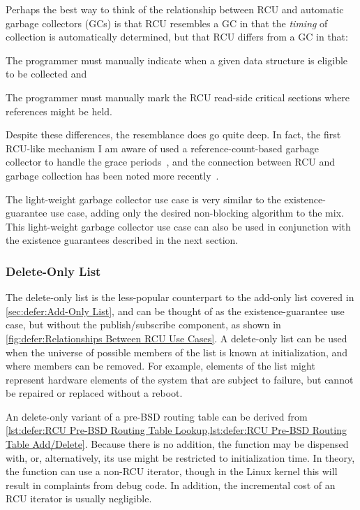 Perhaps the best way to think of the relationship between RCU
and automatic garbage collectors (GCs) is that RCU resembles
a GC in that the \emph{timing} of collection is automatically
determined, but that RCU differs from a GC in that:
\begin{enumerate*}[(1)]
\item The programmer must manually indicate when a given data
structure is eligible to be collected and
\item The programmer must manually mark the RCU read-side critical
sections where references might be held.
\end{enumerate*}

Despite these differences, the resemblance does go quite deep.
In fact, the first RCU-like mechanism I am aware of used a
reference-count-based garbage collector to handle the grace
periods~\cite{Kung80}, and the connection between RCU and
garbage collection has been noted more
recently~\cite{HarshalSheth2016goRCU}.

The light-weight garbage collector use case is very similar to
the existence-guarantee use case, adding only the desired non-blocking
algorithm to the mix.
This light-weight garbage collector use case can also be used in
conjunction with the existence guarantees described in the next section.

\subsubsection{Delete-Only List}
\label{sec:defer:Delete-Only List}

The delete-only list is the less-popular counterpart to the add-only list
covered in \cref{sec:defer:Add-Only List}, and can be thought of as the
existence-guarantee use case, but without the publish/subscribe component,
as shown in \cref{fig:defer:Relationships Between RCU Use Cases}.
A delete-only list can be used when the universe of possible members of
the list is known at initialization, and where members can be removed.
For example, elements of the list might represent hardware elements of
the system that are subject to failure, but cannot be repaired or
replaced without a reboot.

An delete-only variant of a pre-BSD routing table can be derived from
\cref{lst:defer:RCU Pre-BSD Routing Table Lookup,lst:defer:RCU Pre-BSD Routing Table Add/Delete}.
Because there is no addition, the  function may be
dispensed with, or, alternatively, its use might be restricted to
initialization time.
In theory, the  function can use a non-RCU iterator,
though in the Linux kernel this will result in complaints from debug code.
In addition, the incremental cost of an RCU iterator is usually
negligible.


